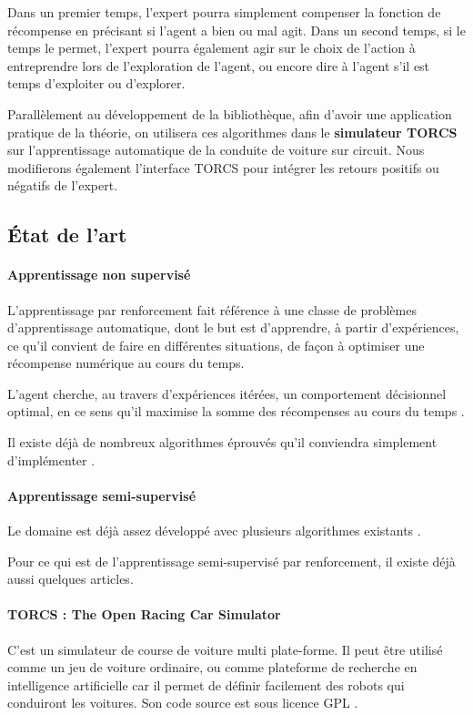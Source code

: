 \documentclass[a4paper,12pt]{article}
\begin{document}
	Dans un premier temps, l'expert pourra simplement compenser la fonction de récompense en précisant si 
	l'agent a bien ou mal agit. Dans un second temps, si le temps le permet, l'expert pourra également agir 
	sur le choix de l'action à entreprendre lors de l'exploration de l'agent, ou encore dire à l'agent s'il 
	est temps d'exploiter ou d'explorer.
	
	Parallèlement au développement de la bibliothèque, afin d'avoir une application pratique de la théorie,
	on utilisera ces algorithmes dans le \textbf{simulateur TORCS} sur l'apprentissage automatique de la conduite de 
	voiture sur circuit. Nous modifierons également l'interface TORCS pour intégrer les retours positifs ou 
	négatifs de l'expert.

  \subsection{État de l'art}
    \paragraph{Apprentissage non supervisé} 
      L'apprentissage par renforcement fait référence à une classe de problèmes d'apprentissage automatique, 
      dont le but est d'apprendre, à partir d'expériences, ce qu'il convient de faire en différentes situations, 
      de façon à optimiser une récompense numérique au cours du temps.

      L'agent cherche, au travers d'expériences itérées, un comportement décisionnel optimal, en ce sens qu'il 
      maximise la somme des récompenses au cours du temps
      \cite{Wiki_Reinforcement_learning}.
      
      Il existe déjà de nombreux algorithmes éprouvés qu'il conviendra simplement d'implémenter
      \cite{ReinforceLearningIntro}.
  
    \vfill
    \paragraph{Apprentissage semi-supervisé} 
      Le domaine est déjà assez développé avec plusieurs algorithmes existants
      \cite{Wiki_SemiSupervised}.
      
      Pour ce qui est de l'apprentissage semi-supervisé par renforcement, il existe déjà aussi quelques articles.
  
    \paragraph{TORCS : The Open Racing Car Simulator} C'est un simulateur de course de voiture multi plate-forme.
    Il peut être utilisé comme un jeu de voiture ordinaire, ou comme plateforme de recherche en intelligence artificielle 
    car il permet de définir facilement des robots qui conduiront les voitures. 
    Son code source est sous licence GPL
    \cite{TORCS}.
    
\end{document}

